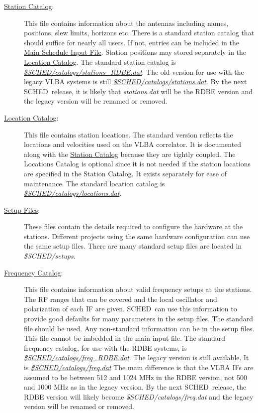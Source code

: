 \documentclass{report}
\newcommand{\schedb}{{\sc SCHED~}}
\begin{document}
\begin{description}
\item[
{\hyperref[SEC:STACAT]{Station Catalog}}:] This file contains
information about the antennas including names, positions, slew
limits, horizons etc.  There is a standard station catalog that should
suffice for nearly all users.  If not, entries can be included in the
{\hyperref[SEC:SCHPAR]{Main Schedule Input File}}.  Station positions may
stored separately in the 
{\hyperref[SEC:STACAT]{Location Catalog}}.  The
standard station catalog is 
{\href{catalogs/stations\_RDBE.dat}{{\sl \$SCHED/catalogs/stations\_RDBE.dat}}}.
The old version for use with the legacy VLBA systems is still 
{\href{catalogs/stations.dat}{{\sl \$SCHED/catalogs/stations.dat}}}.
By the next \schedb release, it is likely that
{\sl stations.dat} will be the RDBE version
and the legacy version will be renamed or removed.

\item[
{\hyperref[SEC:STACAT]{Location Catalog}}:] This file contains
station locations.  The standard version reflects the locations and
velocities used on the VLBA correlator.  It is documented along with
the 
{\hyperref[SEC:STACAT]{Station Catalog}} because they are tightly
coupled.  The Locations Catalog is optional since it is not needed if
the station locations are specified in the Station Catalog.  It exists
separately for ease of maintenance.  The standard
location catalog is 
{\href{catalogs/locations.dat}{{\sl \$SCHED/catalogs/locations.dat}}}.

\item[
{\hyperref[SEC:SETUPS]{Setup Files}}:] These files contain the
details required to configure the hardware at the stations.  Different
projects using the same hardware configuration can use the same setup
files.  There are many standard setup files are located in
{\sl \$SCHED/setups}.

\item[
{\hyperref[SEC:FRQCAT]{Frequency Catalog}}:] This file contains
information about valid frequency setups at the stations.  The RF
ranges that can be covered and the local oscillator and polarization
of each IF are given.  \schedb can use this information to provide
good defaults for many parameters in the setup files.  The standard
file should be used.  Any non-standard information can be in the setup
files.  This file cannot be imbedded in the main input file.  The standard
frequency catalog, for use with the RDBE systems, is 
{\href{catalogs/freq\_RDBE.dat}{{\sl \$SCHED/catalogs/freq\_RDBE.dat}}}.
The legacy version is still available.  It is 
{\href{catalogs/freq.dat}{{\sl \$SCHED/catalogs/freq.dat}}}
The main difference is that the VLBA IFs are assumed to be between 512
and 1024 MHz in the RDBE version, not 500 and 1000 MHz as in the legacy
version.  By the next \schedb release, the RDBE version will likely become
{\sl \$SCHED/catalogs/freq.dat} and the legacy version will be renamed or
removed.


\end{description}
\end{document}
